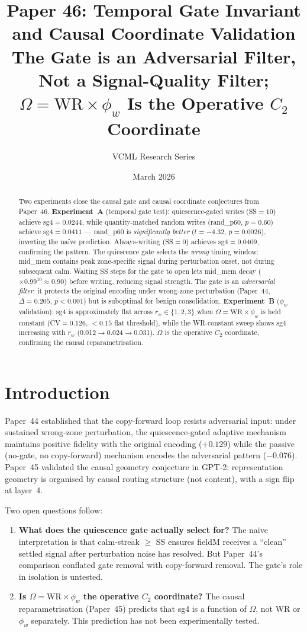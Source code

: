 \documentclass[11pt,a4paper]{article}
\title{\textbf{Paper 46: Temporal Gate Invariant and Causal Coordinate Validation}\\
\large The Gate is an Adversarial Filter, Not a Signal-Quality Filter;
$\Omega = \mathrm{WR}\times\phi_w$ Is the Operative $C_2$ Coordinate}
\author{VCML Research Series}
\date{March 2026}
\begin{document}
\maketitle

\begin{abstract}
Two experiments close the causal gate and causal coordinate conjectures from Paper~46.
\textbf{Experiment~A} (temporal gate test): quiescence-gated writes (SS$=10$) achieve
sg4$=0.0244$, while quantity-matched random writes (rand\_p60, $p=0.60$) achieve
sg4$=0.0411$ --- rand\_p60 is \emph{significantly better}
($t=-4.32$, $p=0.0026$), inverting the na\"ive prediction.
Always-writing (SS$=0$) achieves sg4$=0.0409$, confirming the pattern.
The quiescence gate selects the \emph{wrong} timing window: mid\_mem contains
peak zone-specific signal during perturbation onset, not during subsequent calm.
Waiting SS steps for the gate to open lets mid\_mem decay ($\times 0.99^{10}\approx0.90$)
before writing, reducing signal strength.
The gate is an \emph{adversarial filter}: it protects the original encoding under
wrong-zone perturbation (Paper~44, $\Delta=0.205$, $p<0.001$) but is suboptimal
for benign consolidation.
\textbf{Experiment~B} ($\phi_w$ validation): sg4 is approximately flat across
$r_w \in \{1,2,3\}$ when $\Omega = \mathrm{WR}\times\phi_w$ is held constant
(CV$=0.126$, $< 0.15$ flat threshold), while the WR-constant sweep shows
sg4 increasing with $r_w$ (0.012$\to$0.024$\to$0.031).
$\Omega$ is the operative $C_2$ coordinate, confirming the causal reparametrisation.
\end{abstract}

\section{Introduction}

Paper~44 established that the copy-forward loop resists adversarial input:
under sustained wrong-zone perturbation, the quiescence-gated adaptive mechanism
maintains positive fidelity with the original encoding ($+0.129$) while the
passive (no-gate, no copy-forward) mechanism encodes the adversarial pattern ($-0.076$).
Paper~45 validated the causal geometry conjecture in GPT-2: representation geometry
is organised by causal routing structure (not content), with a sign flip at layer~4.

Two open questions follow:

\begin{enumerate}
\item \textbf{What does the quiescence gate actually select for?}
  The na\"ive interpretation is that calm-streak $\geq$ SS ensures fieldM receives
  a ``clean'' settled signal after perturbation noise has resolved.
  But Paper~44's comparison conflated gate removal with copy-forward removal.
  The gate's role in isolation is untested.

\item \textbf{Is $\Omega = \mathrm{WR}\times\phi_w$ the operative $C_2$ coordinate?}
  The causal reparametrisation (Paper~45) predicts that sg4 is a function of
  $\Omega$, not WR or $\phi_w$ separately.
  This prediction has not been experimentally tested.
\end{enumerate}
\end{document}
